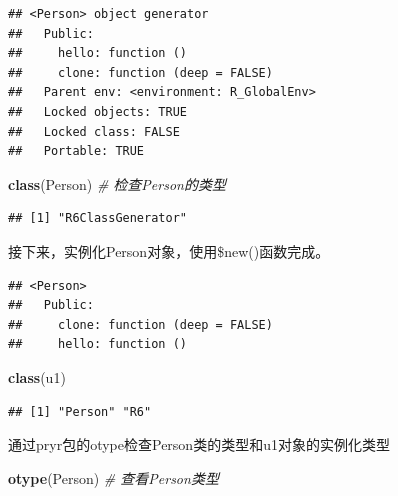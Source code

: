 \documentclass[]{book}
\newenvironment{Shaded}{\begin{snugshade}}{\end{snugshade}}
\newcommand{\KeywordTok}[1]{\textcolor[rgb]{0.13,0.29,0.53}{\textbf{#1}}}
\newcommand{\StringTok}[1]{\textcolor[rgb]{0.31,0.60,0.02}{#1}}
\newcommand{\CommentTok}[1]{\textcolor[rgb]{0.56,0.35,0.01}{\textit{#1}}}
\newcommand{\OperatorTok}[1]{\textcolor[rgb]{0.81,0.36,0.00}{\textbf{#1}}}
\newcommand{\NormalTok}[1]{#1}
\begin{document}
\begin{verbatim}
## <Person> object generator
##   Public:
##     hello: function () 
##     clone: function (deep = FALSE) 
##   Parent env: <environment: R_GlobalEnv>
##   Locked objects: TRUE
##   Locked class: FALSE
##   Portable: TRUE
\end{verbatim}

\begin{Shaded}
\begin{Highlighting}[]
\KeywordTok{class}\NormalTok{(Person) }\CommentTok{# 检查Person的类型}
\end{Highlighting}
\end{Shaded}

\begin{verbatim}
## [1] "R6ClassGenerator"
\end{verbatim}

接下来，实例化Person对象，使用\$new()函数完成。

\begin{Shaded}
\end{Shaded}

\begin{verbatim}
## <Person>
##   Public:
##     clone: function (deep = FALSE) 
##     hello: function ()
\end{verbatim}

\begin{Shaded}
\begin{Highlighting}[]
\KeywordTok{class}\NormalTok{(u1)}
\end{Highlighting}
\end{Shaded}

\begin{verbatim}
## [1] "Person" "R6"
\end{verbatim}

通过pryr包的otype检查Person类的类型和u1对象的实例化类型

\begin{Shaded}
\begin{Highlighting}[]
\KeywordTok{otype}\NormalTok{(Person) }\CommentTok{# 查看Person类型}
\end{Highlighting}
\end{Shaded}
\end{document}
